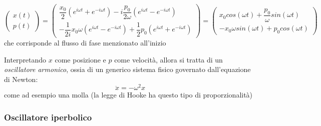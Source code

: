 \documentclass[a4paper,openany]{article}
\begin{document}
	\begin{equation}\label{key}
		\begin{pmatrix}
			x(t) \\ p(t)
		\end{pmatrix}
		= 
		\begin{pmatrix}
			\dfrac{x_0}{2}(e^{i\omega t} + e^{-i\omega t}) - i\dfrac{p_0}{2\omega}(e^{i\omega t} - e^{-i\omega t}) \\
			-\dfrac{1}{2i}x_0 \omega(e^{i\omega t} - e^{-i\omega t}) + \dfrac{1}{2}p_0(e^{i\omega t}+e^{-i\omega t})
		\end{pmatrix} = 
		\begin{pmatrix}
			x_0 cos(\omega t)+\dfrac{p_0}{\omega}sin(\omega t) \\
			- x_0 \omega sin(\omega t) + p_0 cos(\omega t)
		\end{pmatrix}
	\end{equation}
	che corrisponde al flusso di fase menzionato all'inizio
	
	
	Interpretando $x$ come posizione e $p$ come velocità, allora si tratta di un \textit{oscillatore armonico}, ossia di un generico sistema fisico governato dall'equazione di Newton:
	$$
	\ddot{x} = -\omega^{2}x
	$$
	come ad esempio una molla (la legge di Hooke ha questo tipo di proporzionalità)
	\subsubsection{Oscillatore iperbolico}
\end{document}
